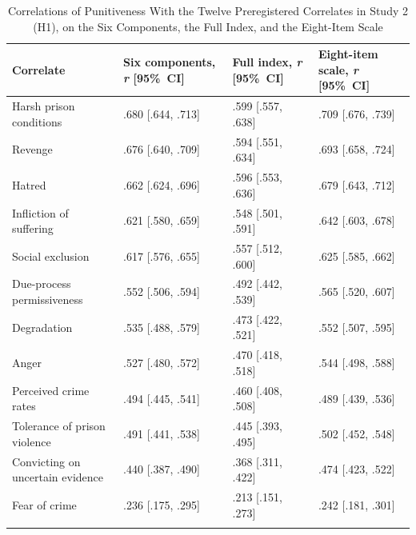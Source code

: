 \begin{table}[!htbp]
\renewcommand{\thetable}{S6}
\caption{Correlations of Punitiveness With the Twelve Preregistered Correlates in Study 2 (H1), on the Six Components, the Full Index, and the Eight-Item Scale}
\label{tab:s6}
\footnotesize
\begin{tabular}{@{}>{\raggedright\arraybackslash}p{1.910in}>{\centering\arraybackslash}p{1.438in}>{\centering\arraybackslash}p{1.202in}>{\centering\arraybackslash}p{1.449in}@{}}
\toprule
Correlate & Six components, \emph{r} {[}95\%~CI{]} & Full index, \emph{r} {[}95\%~CI{]} & Eight-item scale, \emph{r} {[}95\%~CI{]} \\
\midrule
Harsh prison conditions & .680 {[}.644, .713{]} & .599 {[}.557, .638{]} & .709 {[}.676, .739{]} \\
Revenge & .676 {[}.640, .709{]} & .594 {[}.551, .634{]} & .693 {[}.658, .724{]} \\
Hatred & .662 {[}.624, .696{]} & .596 {[}.553, .636{]} & .679 {[}.643, .712{]} \\
Infliction of suffering & .621 {[}.580, .659{]} & .548 {[}.501, .591{]} & .642 {[}.603, .678{]} \\
Social exclusion & .617 {[}.576, .655{]} & .557 {[}.512, .600{]} & .625 {[}.585, .662{]} \\
Due-process permissiveness & .552 {[}.506, .594{]} & .492 {[}.442, .539{]} & .565 {[}.520, .607{]} \\
Degradation & .535 {[}.488, .579{]} & .473 {[}.422, .521{]} & .552 {[}.507, .595{]} \\
Anger & .527 {[}.480, .572{]} & .470 {[}.418, .518{]} & .544 {[}.498, .588{]} \\
Perceived crime rates & .494 {[}.445, .541{]} & .460 {[}.408, .508{]} & .489 {[}.439, .536{]} \\
Tolerance of prison violence & .491 {[}.441, .538{]} & .445 {[}.393, .495{]} & .502 {[}.452, .548{]} \\
Convicting on uncertain evidence & .440 {[}.387, .490{]} & .368 {[}.311, .422{]} & .474 {[}.423, .522{]} \\*
Fear of crime & .236 {[}.175, .295{]} & .213 {[}.151, .273{]} & .242 {[}.181, .301{]} \\*
\bottomrule
\end{tabular}

\end{table}
